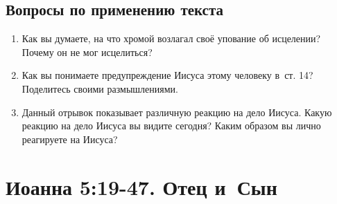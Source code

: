 \documentclass[a4paper,12pt]{article}
\begin{document}
\subsection*{Вопросы по применению текста} 
\begin{enumerate}
    \item Как вы думаете, на что хромой возлагал своё упование об исцелении? Почему он не мог исцелиться?
    
    \myline
    
    \myline
    \item Как вы понимаете предупреждение Иисуса этому человеку в~ст. 14? Поделитесь своими размышлениями.
    
    \myline
    
    \myline
    \item Данный отрывок показывает различную реакцию на дело Иисуса. Какую реакцию на дело Иисуса вы видите сегодня? Каким образом вы лично реагируете на Иисуса?
    
    \myline
    
    \myline
\end{enumerate}



\section{Иоанна 5:19-47. Отец и~Сын}
\end{document}
